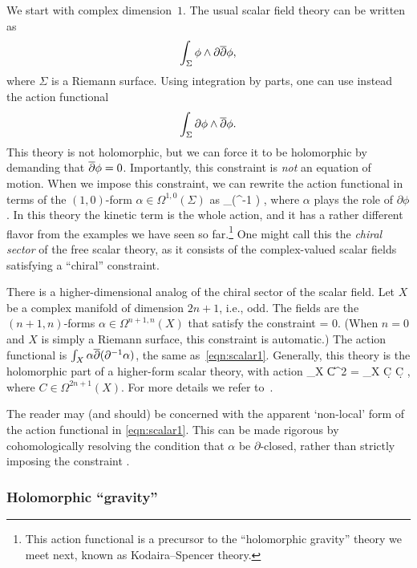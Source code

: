 \documentclass[11pt]{amsart}
\def\del{\partial}
\renewcommand{\op}{\operatorname}
\begin{document}
We start with complex dimension~$1$.
The usual scalar field theory can be written as 
\[
\int_{\Sigma} \phi \wedge \del \dbar \phi, 
\]
where $\Sigma$ is a Riemann surface.
Using integration by parts, one can use instead the action functional
\[
\int_{\Sigma} \partial \phi \wedge {\overline{\partial}} \phi.
\]
This theory is not holomorphic, but we can force it to be holomorphic by demanding that ${\overline{\partial}} \phi = 0$.
Importantly, this constraint is \textit{not} an equation of motion.
When we impose this constraint, we can rewrite the action functional in terms of the $(1,0)$-form $\alpha \in \Omega^{1,0}(\Sigma)$ as
\beqn\label{eqn:scalar1}
\int_\Sigma \alpha \wedge \dbar (\del^{-1} \alpha) ,
\eeqn
where $\alpha$ plays the role of $\partial \phi$.
In this theory the kinetic term is the whole action,
and it has a rather different flavor from the examples we have seen so far.\footnote{This action functional is a precursor to the ``holomorphic gravity'' theory we meet next, 
known as Kodaira--Spencer theory.}
One might call this the {\em chiral sector} of the free scalar theory,
as it consists of the complex-valued scalar fields satisfying a ``chiral'' constraint.

There is a higher-dimensional analog of the chiral sector of the scalar field.
Let $X$ be a complex manifold of dimension $2n+1$, i.e., odd.
The fields are the $(n+1,n)$-forms $\alpha \in \Omega^{n+1,n}(X)$ that satisfy the constraint
\beqn
\del \alpha = 0.
\eeqn
(When $n=0$ and $X$ is simply a Riemann surface, 
this constraint is automatic.)
The action functional is $\int_X \alpha \dbar(\del^{-1} \alpha)$, the same as~\eqref{eqn:scalar1}.
Generally, this theory is the holomorphic part of a higher-form scalar theory, with action
\beqn
\int_X \|C\|^2 \op{dvol} = \int_X \d C \wedge \star \d C , 
\eeqn
where $C \in \Omega^{2n+1}(X)$.
For more details we refer to~\cite{GRWwzw}.

The reader may (and should) be concerned with the apparent `non-local' form of the action functional in \eqref{eqn:scalar1}.
This can be made rigorous by cohomologically resolving the condition that $\alpha$ be $\del$-closed, rather than strictly imposing the constraint \cite{CLbcov1}.

\subsubsection{Holomorphic ``gravity''}
\end{document}

